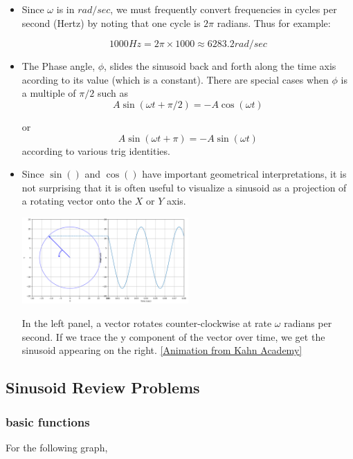 \begin{itemize}

\item Since $\omega$ is in $rad/sec$, we must frequently convert frequencies in cycles per second (Hertz)
by noting that one cycle is $2\pi$ radians. Thus for example:

  \[
    1000 Hz = 2\pi\times 1000 \approx 6283.2 rad/sec
    \]

\item The Phase angle, $\phi$, slides the sinusoid back and forth along the time axis acording to its value
(which is a constant).  There are special cases when $\phi$ is a multiple of $\pi/2$ such as
\[
  A \sin(\omega t + \pi/2) = -A \cos(\omega t)
  \]

or
\[
  A \sin(\omega t + \pi) = -A \sin(\omega t)
  \]
according to various trig identities.

\item Since $\sin()$ and $\cos()$ have important geometrical interpretations, it is not surprising that it is often useful to
visualize a sinusoid as a projection of a rotating vector onto the $X$ or $Y$ axis.

\includegraphics[width=0.5\textwidth]{figsChapt02/MQ41BN01.png}

In the left panel, a vector rotates counter-clockwise at rate $\omega$ radians
per second.   If we trace the y component of the vector over time, we get the
sinusoid appearing on the right.
\href {https://youtu.be/a_zReGTxdlQ?si=hQbJcQvjlW3IVkuE&t=73} {[Animation from Kahn Academy]}

\end{itemize}

\subsection*{Sinusoid Review Problems}

\subsubsection*{basic functions}
For the following graph,

